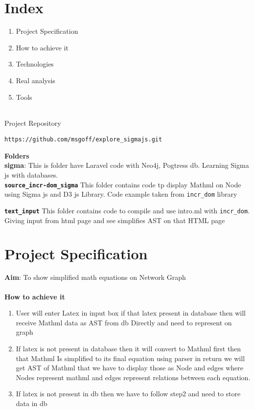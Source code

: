 \documentclass[15]{article}
\begin{document}
\section{Index}
\begin{enumerate}
\item Project Specification 
\item How to achieve it 
\item Technologies
\item Real analysis
\item Tools
\end{enumerate}
\\
Project Repository
\\
\begin{verbatim}
https://github.com/msgoff/explore_sigmajs.git
\end{verbatim}

\textbf{Folders}
\\
\textbf{sigma}: This is folder have Laravel code with Neo4j, Pogtress db.
Learning Sigma js with databases.
\\
\textbf{\texttt{source\_incr-dom\_sigma}}  This folder contains code tp display Mathml on Node using Sigma js and D3 js Library.
Code example taken from \texttt{incr\_dom} library

\textbf{\texttt{text\_input}} This folder contains code to compile 
and use intro.ml with \texttt{incr\_dom}.
Giving input from html page and see simplifies AST on that HTML page


\pagebreak 
\section{Project Specification}

\textbf{Aim}: To show simplified math equations on Network Graph\\
\\
\textbf{How to achieve it}
\
\begin{enumerate}

\item User will enter Latex in input box if that latex present in database then will receive Mathml data as AST from db Directly and need to represent on graph


\item If latex is not present in database then it will convert to Mathml first then that Mathml
Is simplified to its final equation using parser in return we will get AST of Mathml that we have to display those as Node and edges where Nodes represent mathml and edges represent relations between each equation.

\item If latex is not present in db then we have to follow step2 and need to store data in db
\end{enumerate}
\end{document}

